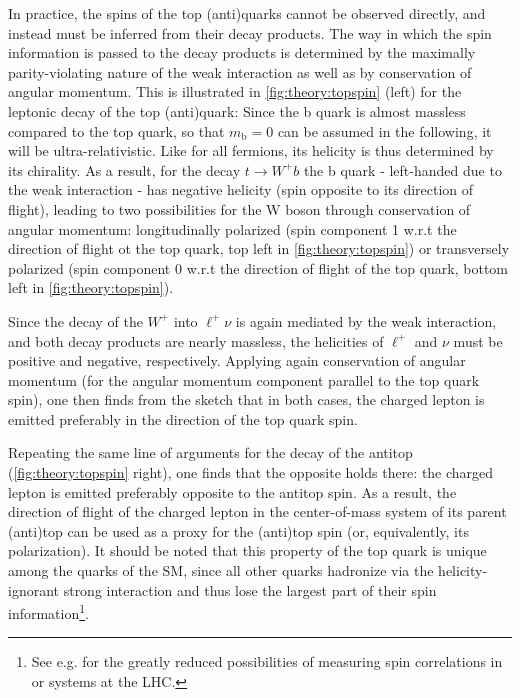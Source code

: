 In practice, the spins of the top (anti)quarks cannot be observed directly, and instead must be inferred from their decay products. The way in which the spin information is passed to the decay products is determined by the maximally parity-violating nature of the weak interaction as well as by conservation of angular momentum. This is illustrated in \cref{fig:theory:topspin} (left) for the leptonic decay of the top (anti)quark: Since the b quark is almost massless compared to the top quark, so that $m_{\mathrm{b}} = 0$ can be assumed in the following, it will be ultra-relativistic. Like for all fermions, its helicity is thus determined by its chirality. As a result, for the decay $t \rightarrow W^+ b$ the b quark - left-handed due to the weak interaction - has negative helicity (spin opposite to its direction of flight), leading to two possibilities for the W boson through conservation of angular momentum: longitudinally polarized (spin component 1 w.r.t the direction of flight ot the top quark, top left in \cref{fig:theory:topspin}) or transversely polarized (spin component 0 w.r.t the direction of flight of the top quark, bottom left in \cref{fig:theory:topspin}).

Since the decay of the $W^+$ into $\ell^+ \nu$ is again mediated by the weak interaction, and both decay products are nearly massless, the helicities of $\ell^+$ and $\nu$ must be positive and negative, respectively. Applying again conservation of angular momentum (for the angular momentum component parallel to the top quark spin), one then finds from the sketch that in both cases, the charged lepton is emitted preferably in the direction of the top quark spin. 

Repeating the same line of arguments for the decay of the antitop (\cref{fig:theory:topspin} right), one finds that the opposite holds there: the charged lepton is emitted preferably opposite to the antitop spin. As a result, the direction of flight of the charged lepton in the center-of-mass system of its parent (anti)top can be used as a proxy for the (anti)top spin (or, equivalently, its polarization). It should be noted that this property of the top quark is unique among the quarks of the SM, since all other quarks hadronize via the helicity-ignorant strong interaction and thus lose the largest part of their spin information\footnote{See e.g.  for the greatly reduced possibilities of measuring spin correlations in \bbbar or \ccbar systems at the LHC.}.

